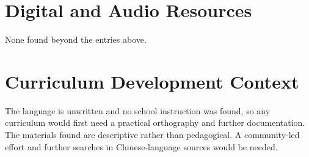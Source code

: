 \documentclass[12pt]{article}
\begin{document}
\section{Digital and Audio Resources}
None found beyond the entries above.

\section{Curriculum Development Context}
The language is unwritten and no school instruction was found, so any curriculum would first need a practical orthography and further documentation. The materials found are descriptive rather than pedagogical. A community-led effort and further searches in Chinese-language sources would be needed.
\end{document}
